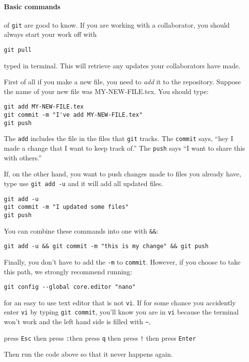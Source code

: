 \documentclass{ximera}
\begin{document}
\paragraph{Basic commands} of \verb!git! are good to know.
If you are working with a collaborator, you should always start your work off with
\begin{verbatim}
git pull
\end{verbatim}
typed in terminal. This will retrieve any updates your collaborators have made. 

First of all if you make a new file, you need to \textit{add} it to the
repository. Suppose the name of your new file was MY-NEW-FILE.tex. You should
type:

\begin{verbatim}
git add MY-NEW-FILE.tex
git commit -m "I've add MY-NEW-FILE.tex"
git push
\end{verbatim}
The \verb!add! includes the file in the files that \verb!git! tracks. The
\verb!commit! says, ``hey I made a change that I want to keep track of.'' The
\verb!push! says ``I want to share this with others.''

If, on the other hand, you want to push changes made to files you already have,
type use \verb!git add -u! and it will add all updated files. 
\begin{verbatim}
git add -u
git commit -m "I updated some files"
git push
\end{verbatim}
You can combine these commands into one with \verb!&&!:
\begin{verbatim}
git add -u && git commit -m "this is my change" && git push
\end{verbatim}

Finally, you don't have to add the \verb!-m! to \verb!commit!. However, if you
choose to take this path, we strongly recommend running:
\begin{verbatim}
git config --global core.editor "nano"
\end{verbatim}
for an easy to use text editor that is not \verb!vi!. If for some chance you
accidently enter \verb!vi! by typing \verb!git commit!, you'll know you are in
\verb!vi! because the terminal won't work and the left hand side is filled with
\verb!~!,
\begin{center}
    press \verb!Esc! \quad then press \verb!:!\quad then press \verb!q! \quad
    then
    press \verb#!# \quad then press \verb!Enter!
\end{center}
Then run the code above so that it never happens again.
\end{document}
